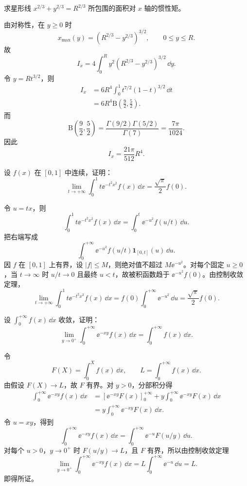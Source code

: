 \begin{xreferenceproblem}[10]
求星形线 $x^{2/3}+y^{2/3}=R^{2/3}$ 所包围的面积对 $x$ 轴的惯性矩。
\end{xreferenceproblem}
\begin{xsolution}
由对称性，在 $y\geqslant0$ 时
\[
x_{\max}(y)=\left(R^{2/3}-y^{2/3}\right)^{3/2},
\qquad0\leqslant y\leqslant R.
\]
故
\[
I_x=4\int_0^R y^2
\left(R^{2/3}-y^{2/3}\right)^{3/2}\,\dd y.
\]
令 $y=Rt^{3/2}$，则
\[
\begin{aligned}
I_x
&=6R^4\int_0^1t^{7/2}(1-t)^{3/2}\,\dd t\\
&=6R^4\mathrm{B}\left(\frac92,\frac52\right).
\end{aligned}
\]
而
\[
\mathrm{B}\left(\frac92,\frac52\right)
=\frac{\Gamma(9/2)\Gamma(5/2)}{\Gamma(7)}
=\frac{7\pi}{1024}.
\]
因此
\[
\boxed{I_x=\frac{21\pi}{512}R^4}.
\]
\end{xsolution}


\begin{xreferenceproblem}[11]
设 $f(x)$ 在 $[0,1]$ 中连续，证明：
  \[
    \lim_{t\to+\infty}\int_0^1t\ee^{-t^2x^2}f(x)\,\dd x=\frac{\sqrt\pi}{2}f(0).
  \]
\end{xreferenceproblem}
\begin{xsolution}
令 $u=tx$，则
\[
\int_0^1t\ee^{-t^2x^2}f(x)\,\dd x
=\int_0^t\ee^{-u^2}f(u/t)\,\dd u.
\]
把右端写成
\[
\int_0^{+\infty}\ee^{-u^2}f(u/t)\mathbf{1}_{[0,t]}(u)\,\dd u.
\]
因 $f$ 在 $[0,1]$ 上有界，设 $|f|\leqslant M$，则绝对值不超过
$M\ee^{-u^2}$。对每个固定 $u\geqslant0$，当 $t\to\infty$ 时
$u/t\to0$ 且最终 $u<t$，故被积函数趋于 $\ee^{-u^2}f(0)$。由控制收敛定理，
\[
\boxed{
\lim_{t\to+\infty}
\int_0^1t\ee^{-t^2x^2}f(x)\,\dd x
=f(0)\int_0^{+\infty}\ee^{-u^2}\,\dd u
=\frac{\sqrt\pi}{2}f(0).}
\]
\end{xsolution}


\begin{xreferenceproblem}[12]
设 $\displaystyle\int_0^{+\infty}f(x)\,\dd x$ 收敛，证明：
  \[
    \lim_{y\to0^+}\int_0^{+\infty}\ee^{-xy}f(x)\,\dd x=\int_0^{+\infty}f(x)\,\dd x.
  \]
\end{xreferenceproblem}
\begin{xsolution}
令
\[
F(X)=\int_0^X f(x)\,\dd x,
\qquad
L=\int_0^{+\infty}f(x)\,\dd x.
\]
由假设 $F(X)\to L$，故 $F$ 有界。对 $y>0$，分部积分得
\[
\begin{aligned}
\int_0^{+\infty}\ee^{-xy}f(x)\,\dd x
&=[\ee^{-xy}F(x)]_0^{+\infty}
+y\int_0^{+\infty}\ee^{-xy}F(x)\,\dd x\\
&=y\int_0^{+\infty}\ee^{-xy}F(x)\,\dd x.
\end{aligned}
\]
令 $u=xy$，得到
\[
\int_0^{+\infty}\ee^{-xy}f(x)\,\dd x
=\int_0^{+\infty}\ee^{-u}F(u/y)\,\dd u.
\]
对每个 $u>0$，$y\to0^+$ 时 $F(u/y)\to L$，且 $F$ 有界，所以由控制收敛定理
\[
\lim_{y\to0^+}\int_0^{+\infty}\ee^{-xy}f(x)\,\dd x
=L\int_0^{+\infty}\ee^{-u}\,\dd u=L.
\]
即得所证。
\end{xsolution}


